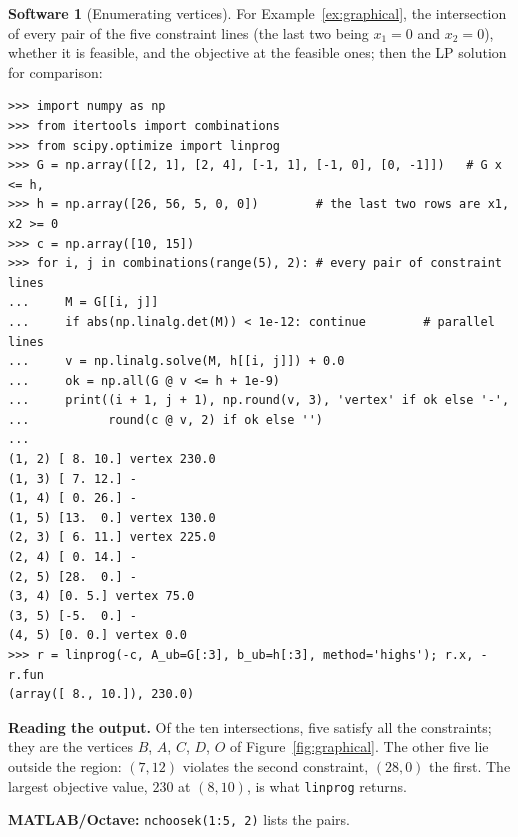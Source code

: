 \documentclass[11pt,a4paper]{article}
\numberwithin{equation}{section}
\theoremstyle{definition}
\newtheorem{software}[thm]{Software}
\begin{document}
\begin{software}[Enumerating vertices]
\label{sw:vertices}
For Example~\ref{ex:graphical}, the intersection of every pair of the five constraint lines (the last two being $x_1 = 0$ and $x_2 = 0$), whether it is feasible, and the objective at the feasible ones; then the LP solution for comparison:
{\small\begin{verbatim}
>>> import numpy as np
>>> from itertools import combinations
>>> from scipy.optimize import linprog
>>> G = np.array([[2, 1], [2, 4], [-1, 1], [-1, 0], [0, -1]])   # G x <= h,
>>> h = np.array([26, 56, 5, 0, 0])        # the last two rows are x1, x2 >= 0
>>> c = np.array([10, 15])
>>> for i, j in combinations(range(5), 2): # every pair of constraint lines
...     M = G[[i, j]]
...     if abs(np.linalg.det(M)) < 1e-12: continue        # parallel lines
...     v = np.linalg.solve(M, h[[i, j]]) + 0.0
...     ok = np.all(G @ v <= h + 1e-9)
...     print((i + 1, j + 1), np.round(v, 3), 'vertex' if ok else '-',
...           round(c @ v, 2) if ok else '')
...
(1, 2) [ 8. 10.] vertex 230.0
(1, 3) [ 7. 12.] - 
(1, 4) [ 0. 26.] - 
(1, 5) [13.  0.] vertex 130.0
(2, 3) [ 6. 11.] vertex 225.0
(2, 4) [ 0. 14.] - 
(2, 5) [28.  0.] - 
(3, 4) [0. 5.] vertex 75.0
(3, 5) [-5.  0.] - 
(4, 5) [0. 0.] vertex 0.0
>>> r = linprog(-c, A_ub=G[:3], b_ub=h[:3], method='highs'); r.x, -r.fun
(array([ 8., 10.]), 230.0)
\end{verbatim}}
\textbf{Reading the output.} Of the ten intersections, five satisfy all the constraints; they are the vertices $B$, $A$, $C$, $D$, $O$ of Figure~\ref{fig:graphical}. The other five lie outside the region: $(7, 12)$ violates the second constraint, $(28, 0)$ the first. The largest objective value, $230$ at $(8, 10)$, is
what \texttt{linprog} returns.

\textbf{MATLAB/Octave:} \texttt{nchoosek(1:5, 2)} lists the pairs.
\end{software}
\end{document}
